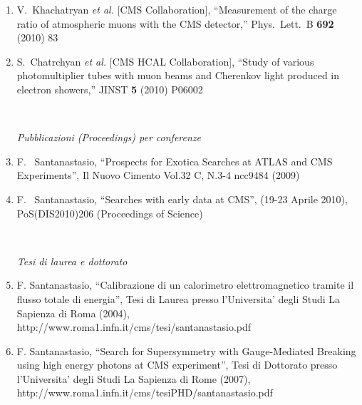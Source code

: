 \documentclass[10pt]{letter}
\begin{document}
\begin{enumerate}
\item V.~Khachatryan {\it et al.} [CMS Collaboration],
  ``Measurement of the charge ratio of atmospheric muons with the CMS detector,''
  Phys.\ Lett.\  B {\bf 692} (2010) 83

\item S.~Chatrchyan {\it et al.}  [CMS HCAL Collaboration],
  ``Study of various photomultiplier tubes with muon beams and Cherenkov light produced in electron showers,''
  JINST {\bf 5} (2010) P06002


~\\
\begin{center} \textit{Pubblicazioni (Proceedings) per conferenze} \\ 
\end{center}

\item F. ~Santanastasio, ``Prospects for Exotica Searches at ATLAS and CMS Experiments'', 
  Il Nuovo Cimento Vol.32 C, N.3-4 ncc9484 (2009)

\item F. ~Santanastasio, ``Searches with early data at CMS'', 
(19-23 Aprile 2010), PoS(DIS2010)206 (Proceedings of Science)


~\\
\begin{center} \textit{Tesi di laurea e dottorato} \\  \end{center}

\item F. Santanastasio, ``Calibrazione di un calorimetro elettromagnetico tramite il flusso totale di energia'', Tesi di Laurea presso l'Universita' degli Studi La Sapienza di Roma (2004), \\ http://www.roma1.infn.it/cms/tesi/santanastasio.pdf 

\item F. Santanastasio, ``Search for Supersymmetry with Gauge-Mediated Breaking using high energy photons at CMS experiment'', Tesi di Dottorato presso l'Universita' degli Studi La Sapienza di Rome (2007),\\ http://www.roma1.infn.it/cms/tesiPHD/santanastasio.pdf 

\end{enumerate}
\end{document}
